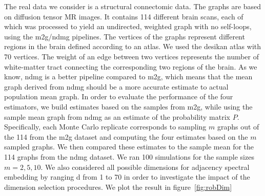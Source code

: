 \documentclass[simplex.tex]{subfiles}
\begin{document}
The real data we consider is a structural connectomic data.
The graphs are based on diffusion tensor MR
images. It contains 114 different brain scans, each of
which was processed to yield an undirected, weighted graph with no
self-loops, using the m2g/ndmg pipelines.  The vertices of the graphs
represent different regions in the brain defined according to an atlas.
We used the  desikan atlas with 70 vertices. The weight of an edge
between two vertices represents the number of white-matter tract
connecting the corresponding two regions of the brain.
As we know, ndmg is a better pipeline compared to m2g, which means that the mean graph derived from ndmg should be a more accurate estimate to actual population mean graph.
In order to evaluate the performance of the four estimators, we build estimates based on the samples from m2g, while using the sample mean graph from ndmg as an estimate of the probability matrix $P$.
Specifically, each Monte Carlo replicate corresponds to sampling $m$ graphs out
of the 114 from the m2g dataset and computing the four estimates based on the $m$ sampled graphs.
We then compared these estimates to the sample mean for the 114 graphs from the ndmg dataset.
We ran 100 simulations for the sample sizes $m=2, 5, 10$.
We also considered all possible dimensions for adjacency spectral embedding by ranging d from 1 to 70 in
order to investigate the impact of the dimension selection procedures.
We plot the result in figure~\ref{fig:robDim}
\end{document}
